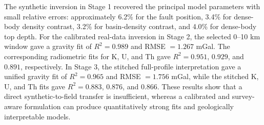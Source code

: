 \documentclass[12pt,a4paper]{article}
\begin{document}
The synthetic inversion in Stage 1 recovered the principal model parameters with small relative errors: approximately 6.2\% for the fault position, 3.4\% for dense-body density contrast, 3.2\% for basin-density contrast, and 4.0\% for dense-body top depth. For the calibrated real-data inversion in Stage 2, the selected 0--10 km window gave a gravity fit of $R^2=0.989$ and RMSE $=1.267$ mGal. The corresponding radiometric fits for K, U, and Th gave $R^2=0.951$, $0.929$, and $0.891$, respectively. In Stage 3, the stitched full-profile interpretation gave a unified gravity fit of $R^2=0.965$ and RMSE $=1.756$ mGal, while the stitched K, U, and Th fits gave $R^2=0.883$, $0.876$, and $0.866$. These results show that a direct synthetic-to-field transfer is insufficient, whereas a calibrated and survey-aware formulation can produce quantitatively strong fits and geologically interpretable models.

\clearpage
\end{document}
